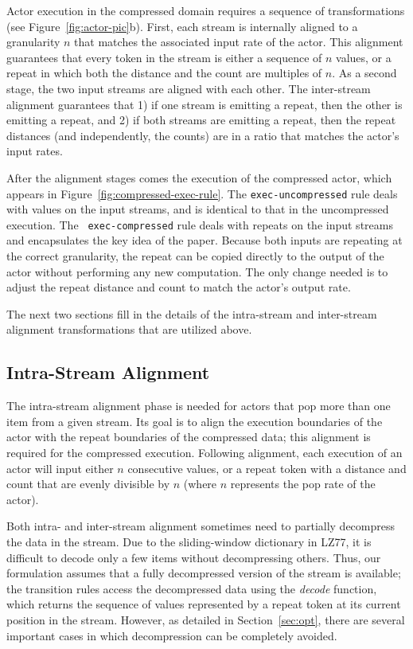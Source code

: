 Actor execution in the compressed domain requires a sequence of
transformations (see Figure~\ref{fig:actor-pic}b).  First, each stream
is internally aligned to a granularity $n$ that matches the associated
input rate of the actor.  This alignment guarantees that every token
in the stream is either a sequence of $n$ values, or a repeat in which
both the distance and the count are multiples of $n$.  As a second
stage, the two input streams are aligned with each other.  The
inter-stream alignment guarantees that 1) if one stream is emitting a
repeat, then the other is emitting a repeat, and 2) if both streams
are emitting a repeat, then the repeat distances (and independently,
the counts) are in a ratio that matches the actor's input rates.

After the alignment stages comes the execution of the compressed
actor, which appears in Figure~\ref{fig:compressed-exec-rule}.  The
{\tt exec-uncompressed} rule deals with values on the input streams,
and is identical to that in the uncompressed execution.  The {\tt
exec-compressed} rule deals with repeats on the input streams and
encapsulates the key idea of the paper.  Because both inputs are
repeating at the correct granularity, the repeat can be copied
directly to the output of the actor without performing any new
computation.  The only change needed is to adjust the repeat distance
and count to match the actor's output rate.

The next two sections fill in the details of the intra-stream and
inter-stream alignment transformations that are utilized above.

\subsection{Intra-Stream Alignment}

The intra-stream alignment phase is needed for actors that pop more
than one item from a given stream.  Its goal is to align the execution
boundaries of the actor with the repeat boundaries of the compressed
data; this alignment is required for the compressed execution.
Following alignment, each execution of an actor will input either $n$
consecutive values, or a repeat token with a distance and count that
are evenly divisible by $n$ (where $n$ represents the pop rate of the
actor).

Both intra- and inter-stream alignment sometimes need to partially
decompress the data in the stream.  Due to the sliding-window
dictionary in LZ77, it is difficult to decode only a few items without
decompressing others.  Thus, our formulation assumes that a fully
decompressed version of the stream is available; the transition rules
access the decompressed data using the \mbox{\it decode} function,
which returns the sequence of values represented by a repeat token at
its current position in the stream.  However, as detailed in
Section~\ref{sec:opt}, there are several important cases in which
decompression can be completely avoided.

